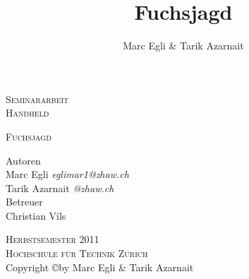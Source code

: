 \begin{titlepage}
\author{Marc Egli \& Tarik Azarnait} 
\title{Fuchsjagd} 
\date{} 
\begin{center}

\Large
\textsc{Seminararbeit}\\
\textsc{Handheld}\\



\vspace{0.5cm}
\begin{center}
\end{center}
\textsc{Fuchsjagd} 
\vspace{1cm}

\large
Autoren\\
Marc Egli \textsl{eglimar1@zhaw.ch}\\
Tarik Azarnait \textsl{@zhaw.ch}\\

\vspace{1cm}
Betreuer\\
Christian Vils\\
\vspace{1.0cm}




\textsc{Herbstsemester 2011}\\
\textsc{Hochschule für Technik Zürich}\\
\vspace{0.5cm}
\normalsize
Copyright \copyright  by Marc Egli \& Tarik Azarnait

\end{center}

\end{titlepage}
\newpage
